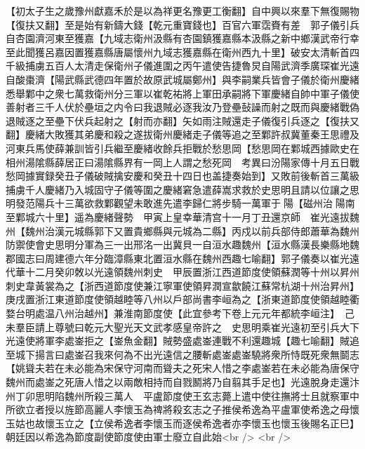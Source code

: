 【初太子生之歲豫州獻嘉禾於是以為祥更名豫更工衡翻】自中興以來羣下無復賜物【復扶又翻】至是始有新鑄大錢【乾元重寶錢也】百官六軍霑賚有差　郭子儀引兵自杏園濟河東至獲嘉【九域志衛州汲縣有杏園鎮獲嘉縣本汲縣之新中鄉漢武帝行幸至此聞獲呂嘉因置獲嘉縣唐屬懷州九域志獲嘉縣在衛州西九十里】破安太清斬首四千級捕虜五百人太清走保衛州子儀進圍之丙午遣使告捷魯炅自陽武濟季廣琛崔光遠自酸棗濟【陽武縣武德四年置於故原武城屬鄭州】與李嗣業兵皆會子儀於衛州慶緒悉舉鄴中之衆七萬救衛州分三軍以崔乾祐將上軍田承嗣將下軍慶緒自帥中軍子儀使善射者三千人伏於壘垣之内令曰我退賊必逐我汝乃登壘鼔譟而射之既而與慶緒戰偽退賊逐之至壘下伏兵起射之【射而亦翻】矢如雨注賊還走子儀復引兵逐之【復扶又翻】慶緒大敗獲其弟慶和殺之遂拔衛州慶緒走子儀等追之至鄴許叔冀董秦王思禮及河東兵馬使薛兼訓皆引兵繼至慶緒收餘兵拒戰於愁思岡【愁思岡在鄴城西據歐史在相州湯隂縣薛居正曰湯隂縣界有一岡上人謂之愁死岡　考異曰汾陽家傳十月五日戰愁岡據實録癸丑子儀破賊擒安慶和癸丑十四日也盖捷奏始到】又敗前後斬首三萬級捕虜千人慶緒乃入城固守子儀等圍之慶緒窘急遣薛嵩求救於史思明且請以位讓之思明發范陽兵十三萬欲救鄴觀望未敢進先遣李歸仁將步騎一萬軍于陽【磁州治陽南至鄴城六十里】遥為慶緒聲勢　甲寅上皇幸華清宫十一月丁丑還京師　崔光遠拔魏州【魏州治漢元城縣郭下又置貴鄉縣與元城為二縣】丙戍以前兵部侍郎蕭華為魏州防禦使會史思明分軍為三一出邢洺一出冀貝一自洹水趣魏州【洹水縣漢長樂縣地魏郡國志曰周建德六年分臨漳縣東北置洹水縣在魏州西趣七喻翻】郭子儀奏以崔光遠代華十二月癸卯敇以光遠領魏州刺史　甲辰置浙江西道節度使領蘇潤等十州以昇州刺史韋黃裳為之【浙西道節度使兼江寧軍使領昇潤宣歙饒江蘇常杭湖十州治昇州】庚戌置浙江東道節度使領越睦等八州以戶部尚書李峘為之【浙東道節度使領越睦衢婺台明處温八州治越州】兼淮南節度使【此宜參考下卷上元元年都統李峘注】　己未羣臣請上尊號曰乾元大聖光天文武孝感皇帝許之　史思明乘崔光遠初至引兵大下光遠使將軍李處崟拒之【崟魚金翻】賊勢盛處崟連戰不利還趣城【趣七喻翻】賊追至城下揚言曰處崟召我來何為不出光遠信之腰斬處崟處崟驍將衆所恃既死衆無鬬志【姚聳夫若在未必能為宋保守河南而聳夫之死宋人惜之李處崟若在未必能為唐保守魏州而處崟之死唐人惜之以兩敵相持而自戮鬭將乃自翦其手足也】光遠脫身走還汴州丁卯思明陷魏州所殺三萬人　平盧節度使王玄志薨上遣中使往撫將士且就察軍中所欲立者授以旌節高麗人李懷玉為禆將殺玄志之子推侯希逸為平盧軍使希逸之母懷玉姑也故懷玉立之【立侯希逸者李懷玉而逐侯希逸者亦李懷玉也懷玉後賜名正巳】朝廷因以希逸為節度副使節度使由軍士廢立自此始<br />
<br />
